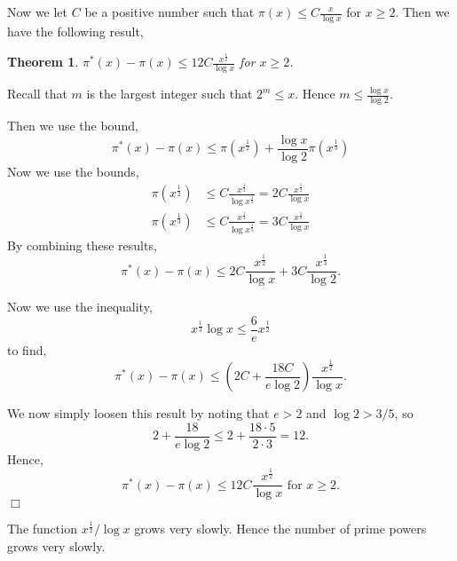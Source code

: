 \documentclass[10pt]{article}
\newtheorem{theorem}{Theorem}
\newenvironment{proof}[1][Proof]{\begin{trivlist}
\item[\hskip \labelsep {\bfseries #1}]}{\end{trivlist}}
\newenvironment{remark}[1][Remark]{\begin{trivlist}
\item[\hskip \labelsep {\bfseries #1}]}{\end{trivlist}}
\begin{document}
Now we let $C$ be a positive number such that $\pi(x) \leq C\frac{x}{\log{x}}$
for $x\geq 2$. Then we have the following result,
\begin{theorem}
    $\pi^*(x)-\pi(x)\leq 12C\frac{x^\frac{1}{2}}{\log{x}}$ for $x \geq 2$.
\end{theorem}
\begin{proof}
    Recall that $m$ is the largest integer such that $2^m\leq x$. Hence $m\leq \frac{\log{x}}{\log{2}}$.
    
    Then we use the bound,
    \begin{equation*}
        \pi^*(x)-\pi(x) \leq \pi(x^\frac{1}{2}) + \frac{\log{x}}{\log{2}}\pi(x^\frac{1}{3})
    \end{equation*}
    Now we use the bounds,
    \begin{align*}
        \pi(x^\frac{1}{2}) &\leq C\frac{x^\frac{1}{2}}{\log{x^\frac{1}{2}}} = 2C\frac{x^\frac{1}{2}}{\log{x}}\\
        \pi(x^\frac{1}{3}) &\leq C\frac{x^\frac{1}{3}}{\log{x^\frac{1}{3}}} = 3C\frac{x^\frac{1}{3}}{\log{x}}
    \end{align*}
    By combining these results, 
    \begin{equation*}
        \pi^*(x)-\pi(x) \leq 2C\frac{x^\frac{1}{2}}{\log{x}}+3C\frac{x^\frac{1}{3}}{\log{2}}.
    \end{equation*}
    
    Now we use the inequality,
    \begin{equation*}
        x^\frac{1}{3}\log{x} \leq \frac{6}{e}x^\frac{1}{2}
    \end{equation*}
    to find,
    \begin{equation*}
        \pi^*(x)-\pi(x) \leq (2C+\frac{18C}{e\log{2}})\frac{x^\frac{1}{2}}{\log{x}}.
    \end{equation*}
    
    We now simply loosen this result by noting that $e>2$ and $\log{2}>3/5$, so
    \begin{equation*}
        2+\frac{18}{e\log{2}}\leq 2+\frac{18\cdot5}{2\cdot3} = 12.
    \end{equation*}
    Hence,
    \begin{equation*}
        \pi^*(x)-\pi(x)\leq 12C\frac{x^\frac{1}{2}}{\log{x}}\text{ for }x \geq 2.
    \end{equation*}
    $\Box$
\end{proof}

\begin{remark}
    The function $x^\frac{1}{2}/\log{x}$ grows very slowly. Hence
    the number of prime powers grows very slowly.    
\end{remark}
\end{document}
